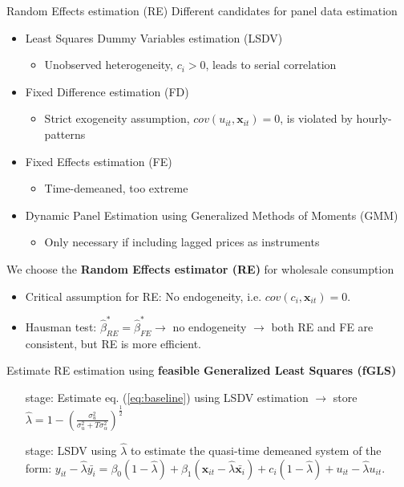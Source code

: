 \begin{frame}{Random Effects estimation (RE)}
Different candidates for panel data estimation
\begin{itemize}
    \item Least Squares Dummy Variables estimation (LSDV)
    \begin{itemize}
        \item Unobserved heterogeneity, $c_i>0$, leads to serial correlation
    \end{itemize}
    \item Fixed Difference estimation (FD)
    \begin{itemize}
        \item Strict exogeneity assumption, $cov(u_{it},\bm{x}_{it})=0$, is violated by hourly-patterns
    \end{itemize}
    \item Fixed Effects estimation (FE)
    \begin{itemize}
        \item Time-demeaned, too extreme
    \end{itemize}
    \item Dynamic Panel Estimation using Generalized Methods of Moments (GMM)
    \begin{itemize}
        \item Only necessary if including lagged prices as instruments
    \end{itemize}
\end{itemize}
We choose the \textbf{Random Effects estimator (RE)} for wholesale consumption
\begin{itemize}
    \item Critical assumption for RE: No endogeneity, i.e. $cov(c_i,\bm{x}_{it})=0$.
    \item Hausman test: $\hat{\beta}^{*}_{RE}=\hat{\beta}^{*}_{FE}\rightarrow$ no endogeneity $\rightarrow$ both RE and FE are consistent, but RE is more efficient.
\end{itemize}
Estimate RE estimation using \textbf{feasible Generalized Least Squares (fGLS)}
\begin{itemize}
    \item[\nth{1} stage:] Estimate eq. (\ref{eq:baseline}) using LSDV estimation $\rightarrow$ store $\hat{\lambda}=1-\left(\frac{\sigma^2_u}{\sigma^2_u+T\sigma^2_\alpha}\right)^\frac{1}{2}$
    \item[\nth{2} stage:] LSDV using $\hat{\lambda}$ to estimate the quasi-time demeaned system of the form: $y_{it}-\hat{\lambda}\bar{y_i}=\beta_0(1-\hat{\lambda})+\beta_1(\bm{x}_{it}-\hat{\lambda}\bar{\bm{x}_i})+c_i(1-\hat{\lambda})+u_{it}-\hat{\lambda}u_{it}$.
\end{itemize}
\end{frame}

